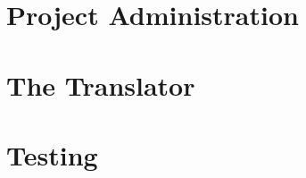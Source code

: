 \documentclass[a4paper,12pt,twoside,openany]{report} %
\begin{document}
\begin{comment} %
\title{A Scheme To Lua Translator \\
{\small 4th Year Computer Science Project} \\
{\small University College Cork}}
\author{Student: George Boyle \\ Student Number: 106827004 \\ \\
Supervisor: Dr.\ Joseph Manning \\
Second Reader: Prof.\ Gregory Provan}


%
%

\maketitle

\tableofcontents


%
%

\chapter{Background (10 pages)}

\end{comment} %

\chapter{Project Administration}


\chapter{The Translator}


\chapter{Testing}


\begin{comment} %
\chapter{Conclusion (5 pages)}



%
%

\appendix

\chapter{Program Source Code}


\chapter{Open Day Materials}



%
%



\end{comment} %
\end{document}
